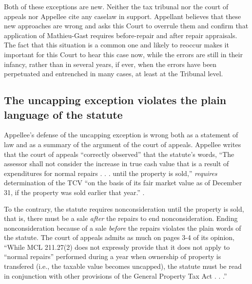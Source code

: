 \documentclass[12pt,\documentclassflag]{michiganCourtOfAppealsBrief}
\begin{document}
Both of these exceptions are new. Neither the tax tribunal nor the court of appeals nor Appellee cite any caselaw in support. Appellant believes that these new approaches are wrong and asks this Court to overrule them and confirm that application of Mathieu-Gast requires before-repair and after repair appraisals.
The fact that this situation is a common one and likely to reoccur makes it important for this Court to hear this case now, while the errors are still in their infancy, rather than in several years, if ever, when the errors have been perpetuated and entrenched in many cases, at least at the Tribunal level.

\subsection{The uncapping exception violates the plain language of the statute}


Appellee's defense of the uncapping exception is wrong both as a statement of law and as a summary of the argument of the court of appeals.
Appellee writes that the court of appeals ``correctly observed'' that the statute's words,
``The assessor shall not consider the increase in true cash value that is a result of expenditures for normal repairs . . . until the property is sold,'' \emph{requires} determination of the TCV ``on the basis of its fair market value as of December 31, if the property was sold earlier that year.'' .

To the contrary, the statute requires nonconsideration until the property is sold, that is, there must be a sale \emph{after} the repairs to end nonconsideration. Ending nonconsideration because of a sale \emph{before} the repairs violates the plain words of the statute. The court of appeals admits as much on pages 3-4 of its opinion, ``While MCL 211.27(2) does not expressly provide that it does not apply to ``normal repairs'' performed during a year when ownership of property is transfered (i.e., the taxable value becomes uncapped), the statute must be read in conjunction with other provisions of the General Property Tax Act . . .''
\end{document}
